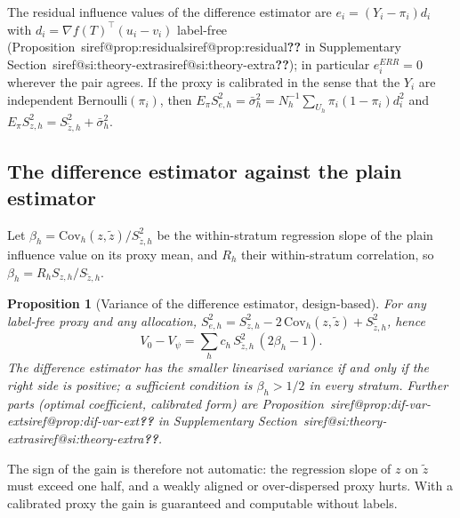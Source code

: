 \documentclass[pdflatex,sn-mathphys-num,iicol]{sn-jnl}
\makeatletter
\theoremstyle{thmstyleone}
\newtheorem{proposition}{Proposition}
\theoremstyle{thmstyletwo}
\theoremstyle{thmstylethree}
\newcommand{\SIref}[1]{\ifcsname siref@#1\endcsname\csname siref@#1\endcsname\else\textbf{??}\fi}
\makeatother
\begin{document}
The residual influence values of the difference estimator are $e_i=(Y_i-\pi_i)d_i$ with $d_i=\nabla f(T)^\top(u_i-v_i)$ label-free
(Proposition~\SIref{prop:residual} in Supplementary Section~\SIref{si:theory-extra}); in particular $e^{ERR}_i=0$ wherever the pair agrees. If the proxy is calibrated in the
sense that the $Y_i$ are independent Bernoulli$(\pi_i)$, then $E_\pi S^2_{e,h}=\bar\sigma^2_h=N_h^{-1}\sum_{U_h}\pi_i(1-\pi_i)d_i^2$ and
$E_\pi S^2_{z,h}=S^2_{\tilde z,h}+\bar\sigma^2_h$.

\subsection{The difference estimator against the plain estimator}\label{sec:theory-dif}

Let $\beta_h=\mathrm{Cov}_h(z,\tilde z)/S^2_{\tilde z,h}$ be the within-stratum regression slope of the plain influence value on its proxy
mean, and $R_h$ their within-stratum correlation, so $\beta_h=R_hS_{z,h}/S_{\tilde z,h}$.

\begin{proposition}[Variance of the difference estimator, design-based]\label{prop:dif-var}
For any label-free proxy and any allocation, $S^2_{e,h}=S^2_{z,h}-2\,\mathrm{Cov}_h(z,\tilde z)+S^2_{\tilde z,h}$, hence
\begin{equation}\label{eq:dif-identity}
V_0-V_\psi=\sum_hc_h\,S^2_{\tilde z,h}\,(2\beta_h-1).
\end{equation}
The difference estimator has the smaller linearised variance if and only if the right side is positive; a sufficient condition is
$\beta_h>1/2$ in every stratum. Further parts (optimal coefficient, calibrated form) are Proposition~\SIref{prop:dif-var-ext} in Supplementary Section~\SIref{si:theory-extra}.
\end{proposition}

The sign of the gain is therefore not automatic: the regression slope of $z$ on $\tilde z$ must exceed one half, and a weakly aligned or
over-dispersed proxy hurts. With a calibrated proxy the gain is guaranteed and computable without labels.
\end{document}
